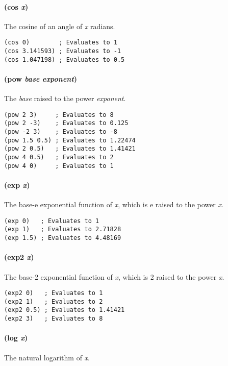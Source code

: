 \documentclass[numbers=noenddot]{scrbook}
\begin{document}
\paragraph{(cos \emph{x})}
The cosine of an angle of \emph{x} radians.

\begin{verbatim}
(cos 0)        ; Evaluates to 1
(cos 3.141593) ; Evaluates to -1
(cos 1.047198) ; Evaluates to 0.5
\end{verbatim}

\paragraph{(pow \emph{base} \emph{exponent})}
The \emph{base} raised to the power \emph{exponent}.

\begin{verbatim}
(pow 2 3)     ; Evaluates to 8
(pow 2 -3)    ; Evaluates to 0.125
(pow -2 3)    ; Evaluates to -8
(pow 1.5 0.5) ; Evaluates to 1.22474
(pow 2 0.5)   ; Evaluates to 1.41421
(pow 4 0.5)   ; Evaluates to 2
(pow 4 0)     ; Evaluates to 1
\end{verbatim}

\paragraph{(exp \emph{x})}
The base-e exponential function of \emph{x}, which is e raised to the power \emph{x}.

\begin{verbatim}
(exp 0)   ; Evaluates to 1
(exp 1)   ; Evaluates to 2.71828
(exp 1.5) ; Evaluates to 4.48169
\end{verbatim}

\paragraph{(exp2 \emph{x})}
The base-2 exponential function of \emph{x}, which is 2 raised to the power \emph{x}.

\begin{verbatim}
(exp2 0)   ; Evaluates to 1
(exp2 1)   ; Evaluates to 2
(exp2 0.5) ; Evaluates to 1.41421
(exp2 3)   ; Evaluates to 8
\end{verbatim}

\paragraph{(log \emph{x})}
The natural logarithm of \emph{x}.
\end{document}
